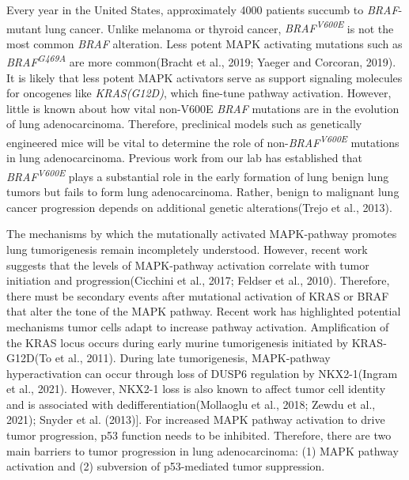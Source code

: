 Every year in the United States, approximately 4000 patients succumb to \emph{BRAF}-mutant lung cancer. Unlike melanoma or thyroid cancer, \emph{BRAF\textsuperscript{V600E}} is not the most common \emph{BRAF} alteration. Less potent MAPK activating mutations such as \emph{BRAF\textsuperscript{G469A}} are more common(Bracht et al., 2019; Yaeger and Corcoran, 2019). It is likely that less potent MAPK activators serve as support signaling molecules for oncogenes like \emph{KRAS(G12D)}, which fine-tune pathway activation. However, little is known about how vital non-V600E \emph{BRAF} mutations are in the evolution of lung adenocarcinoma. Therefore, preclinical models such as genetically engineered mice will be vital to determine the role of non-\emph{BRAF\textsuperscript{V600E}} mutations in lung adenocarcinoma. Previous work from our lab has established that \emph{BRAF\textsuperscript{V600E}} plays a substantial role in the early formation of lung benign lung tumors but fails to form lung adenocarcinoma. Rather, benign to malignant lung cancer progression depends on additional genetic alterations(Trejo et al., 2013).

The mechanisms by which the mutationally activated MAPK-pathway promotes lung tumorigenesis remain incompletely understood. However, recent work suggests that the levels of MAPK-pathway activation correlate with tumor initiation and progression(Cicchini et al., 2017; Feldser et al., 2010). Therefore, there must be secondary events after mutational activation of KRAS or BRAF that alter the tone of the MAPK pathway. Recent work has highlighted potential mechanisms tumor cells adapt to increase pathway activation. Amplification of the KRAS locus occurs during early murine tumorigenesis initiated by KRAS-G12D(To et al., 2011). During late tumorigenesis, MAPK-pathway hyperactivation can occur through loss of DUSP6 regulation by NKX2-1(Ingram et al., 2021). However, NKX2-1 loss is also known to affect tumor cell identity and is associated with dedifferentiation(Mollaoglu et al., 2018; Zewdu et al., 2021); Snyder et al. (2013){]}. For increased MAPK pathway activation to drive tumor progression, p53 function needs to be inhibited. Therefore, there are two main barriers to tumor progression in lung adenocarcinoma: (1) MAPK pathway activation and (2) subversion of p53-mediated tumor suppression.

